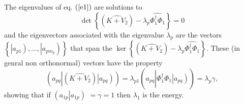 \documentclass[aps,preprint]{revtex4}%
\begin{document}
The eigenvalues of eq. $\left(  \ref{e1}\right)  $ are solutions to
\begin{equation}
\det\left\{  \left(  \widehat{K+V_{2}}\right)  -\lambda_{p}\widehat{\Phi
_{1}^{\dagger}\Phi_{1}}\right\}  =0
\end{equation}
and the eigenvectors associated with the eigenvalue $\lambda_{p}$ are the
vectors $\left\{  \left\vert \overset{}{a_{p1}}\right)  ,\ldots,\left\vert
\overset{}{a_{pm_{p}}}\right)  \right\}  $ that span the $\ker\left\{  \left(
\widehat{K+V_{2}}\right)  -\lambda_{p}\widehat{\Phi_{1}^{\dagger}\Phi_{1}%
}\right\}  $. These (in genral non orthonormal) vectors have the property
\begin{equation}
\left(  \overset{}{a_{pq}}\left\vert \left(  \widehat{K+V_{2}}\right)
\right.  \left\vert \overset{}{a_{pq}}\right)  \right)  =\lambda_{p1}\left(
\overset{}{a_{pq}}\left\vert \widehat{\Phi_{1}^{\dagger}\Phi_{1}}\right.
\left\vert \overset{}{a_{pq}}\right)  \right)  =\lambda_{p}\gamma,
\end{equation}
showing that if $\left(  \left.  \overset{}{a_{1p}}\right\vert \overset
{}{a_{1p}}\right)  $ $=\gamma=1$ then $\lambda_{1}$ is the energy.
\end{document}
